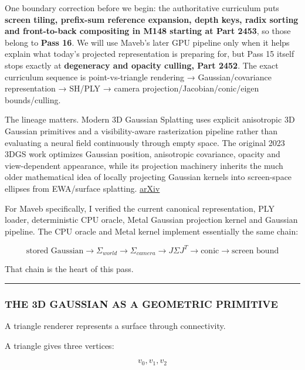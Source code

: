 One boundary correction before we begin: the authoritative curriculum puts \textbf{screen tiling, prefix-sum reference expansion, depth keys, radix sorting and front-to-back compositing in M148 starting at Part 2453}, so those belong to \textbf{Pass 16}. We will use Maveb's later GPU pipeline only when it helps explain what today's projected representation is preparing for, but Pass 15 itself stops exactly at \textbf{degeneracy and opacity culling, Part 2452}. The exact curriculum sequence is point-vs-triangle rendering → Gaussian/covariance representation → SH/PLY → camera projection/Jacobian/conic/eigen bounds/culling.

The lineage matters. Modern 3D Gaussian Splatting uses explicit anisotropic 3D Gaussian primitives and a visibility-aware rasterization pipeline rather than evaluating a neural field continuously through empty space. The original 2023 3DGS work optimizes Gaussian position, anisotropic covariance, opacity and view-dependent appearance, while its projection machinery inherits the much older mathematical idea of locally projecting Gaussian kernels into screen-space ellipses from EWA/surface splatting. \href{https://arxiv.org/abs/2308.04079?utm_source=chatgpt.com}{arXiv}

For Maveb specifically, I verified the current canonical representation, PLY loader, deterministic CPU oracle, Metal Gaussian projection kernel and Gaussian pipeline. The CPU oracle and Metal kernel implement essentially the same chain:

\[
\boxed{
\text{stored Gaussian}
\rightarrow
\Sigma_{world}
\rightarrow
\Sigma_{camera}
\rightarrow
J\Sigma J^T
\rightarrow
\text{conic}
\rightarrow
\text{screen bound}
}
\]

That chain is the heart of this pass.

\begin{center}\rule{0.5\linewidth}{0.5pt}\end{center}

\subsubsection{THE 3D GAUSSIAN AS A GEOMETRIC PRIMITIVE}\label{04-visual-computing-ii-ch037-the-3d-gaussian-as-a-geometric-primitive}

A triangle renderer represents a surface through connectivity.

A triangle gives three vertices:

\[
v_0,v_1,v_2
\]

